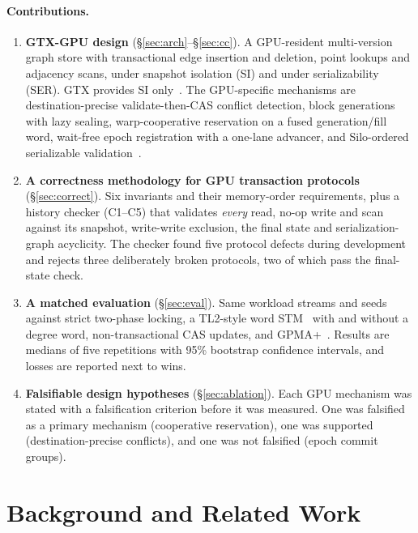 \documentclass[sigconf,nonacm]{acmart}
\newcommand{\sys}{GTX-GPU}
\begin{document}
\paragraph{Contributions.}
\begin{enumerate}
\item \textbf{\sys{} design} (\S\ref{sec:arch}--\S\ref{sec:cc}). A GPU-resident multi-version graph store with
transactional edge insertion and deletion, point lookups and adjacency scans, under snapshot isolation (SI) and under
serializability (SER). GTX provides SI only~\cite{gtx}. The GPU-specific mechanisms are destination-precise
validate-then-CAS conflict detection, block generations with lazy sealing, warp-cooperative reservation on a fused
generation/fill word, wait-free epoch registration with a one-lane advancer, and Silo-ordered serializable
validation~\cite{silo}.
\item \textbf{A correctness methodology for GPU transaction protocols} (\S\ref{sec:correct}). Six invariants and their
memory-order requirements, plus a history checker (C1--C5) that validates \emph{every} read, no-op write and scan
against its snapshot, write-write exclusion, the final state and serialization-graph acyclicity. The checker found five
protocol defects during development and rejects three deliberately broken protocols, two of which pass the
final-state check.
\item \textbf{A matched evaluation} (\S\ref{sec:eval}). Same workload streams and seeds against strict two-phase locking,
a TL2-style word STM~\cite{tl2} with and without a degree word, non-transactional CAS updates, and GPMA+~\cite{gpma}.
Results are medians of five repetitions with 95\% bootstrap confidence intervals, and losses are reported next to wins.
\item \textbf{Falsifiable design hypotheses} (\S\ref{sec:ablation}). Each GPU mechanism was stated with a falsification
criterion before it was measured. One was falsified as a primary mechanism (cooperative reservation), one was
supported (destination-precise conflicts), and one was not falsified (epoch commit groups).
\end{enumerate}

\section{Background and Related Work}
\label{sec:related}
\end{document}
